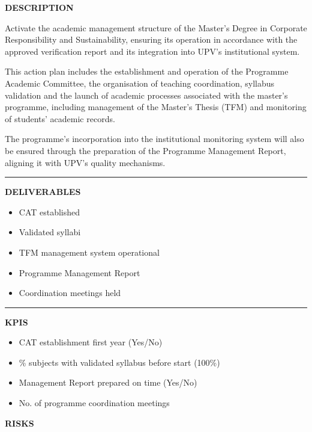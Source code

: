 \documentclass[11pt,a4paper]{scrreprt}
\newcommand{\fieldlabel}[1]{%
  {\footnotesize\sffamily\bfseries\color{mutedcolor}\MakeUppercase{#1}}\par\nopagebreak[4]
}
\newcommand{\fieldsep}{\vspace{3pt}\noindent\textcolor{bordercolor}{\rule{\linewidth}{0.4pt}}\vspace{3pt}\par}
\begin{document}
\begin{tcolorbox}[pabox={aacolor}{A.P.2.2 \enspace\textbullet\enspace Activation of Academic Management for the Master's in Corporate Responsibility and Sustainability}]

\fieldlabel{Description}
{\small Activate the academic management structure of the Master's Degree in Corporate Responsibility and Sustainability, ensuring its operation in accordance with the approved verification report and its integration into UPV's institutional system. 

This action plan includes the establishment and operation of the Programme Academic Committee, the organisation of teaching coordination, syllabus validation and the launch of academic processes associated with the master's programme, including management of the Master's Thesis (TFM) and monitoring of students' academic records. 

The programme's incorporation into the institutional monitoring system will also be ensured through the preparation of the Programme Management Report, aligning it with UPV's quality mechanisms. }\par
\fieldsep
\fieldlabel{Deliverables}
{\small \begin{itemize}[noitemsep,topsep=2pt]
\item CAT established
\item Validated syllabi
\item TFM management system operational
\item Programme Management Report
\item Coordination meetings held
\end{itemize}}\par
\fieldsep
\fieldlabel{KPIs}
{\small \begin{itemize}[noitemsep,topsep=2pt]
\item CAT establishment first year (Yes/No)
\item \% subjects with validated syllabus before start (100\%)
\item Management Report prepared on time (Yes/No)
\item No. of programme coordination meetings
\end{itemize}}\par
\end{tcolorbox}
\begin{tcolorbox}[riskbox]
{\footnotesize\sffamily\bfseries\color{red!50!black} RISKS}\par{}
\end{tcolorbox}
\end{document}
